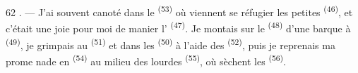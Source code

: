 \begin{VUpage}[64]{62}
. --- J'ai souvent canoté dans le  \textsuperscript{(53)}\nl
où viennent se réfugier les petites  \textsuperscript{(46)},\nl
et c'était une joie pour moi de manier l' \textsuperscript{(47)}.\nl
Je montais sur le  \textsuperscript{(48)} d'une barque à  \textsuperscript{(49)},\nl
je grimpais au  \textsuperscript{(51)} et dans les  \textsuperscript{(50)} à\nl
l'aide des  \textsuperscript{(52)}, puis je reprenais ma prome\cc
nade en  \textsuperscript{(54)} au milieu des lourdes \nl
{} \textsuperscript{(55)}, où sèchent les  \textsuperscript{(56)}.
\end{VUpage}

